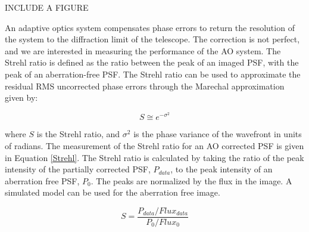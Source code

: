 INCLUDE A FIGURE

An adaptive optics system compensates phase errors to return the resolution of the system to the diffraction limit of the telescope. The correction is not perfect, and we are interested in measuring the performance of the AO system. The Strehl ratio is defined as the ratio between the peak of an imaged PSF, with the peak of an aberration-free PSF. The Strehl ratio can be used to approximate the residual RMS uncorrected phase errors through the Marechal approximation given by:

\begin{equation}
    S \cong e^{-\sigma^2}
\end{equation}

where $S$ is the Strehl ratio, and $\sigma^2$ is the phase variance of the wavefront in units of radians. The measurement of the Strehl ratio for an AO corrected PSF is given in Equation \ref{Strehl}. The Strehl ratio is calculated by taking the ratio of the peak intensity of the partially corrected PSF, $P_{data}$,  to the peak intensity of an aberration free PSF, $P_0$. The peaks are normalized by the flux in the image. A simulated model can be used for the aberration free image. 


\begin{equation}
    S=\frac{P_{data}/Flux_{data}}{P_{0}/Flux_{0}}
    \label{Strehl}
\end{equation}



